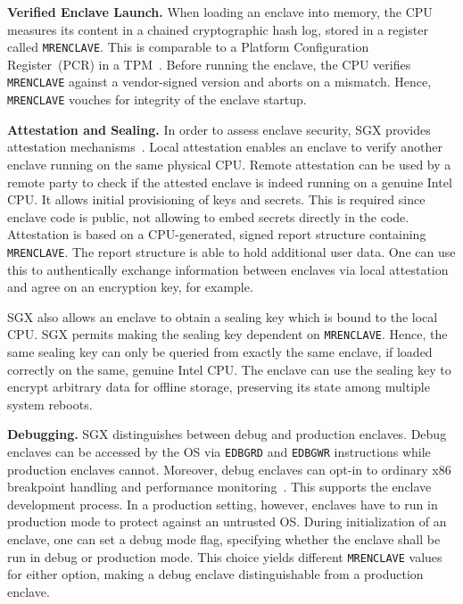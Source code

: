 \documentclass{sig-alternate-05-2015}
\begin{document}
\textbf{Verified Enclave Launch.}\label{sec:enclave_startup}
When loading an enclave into memory, the CPU measures its content in a chained cryptographic hash log, stored in a register called \verb!MRENCLAVE!. This is comparable to a Platform Configuration Register~(PCR) in a TPM~\cite{tpm}. Before running the enclave, the CPU verifies \verb!MRENCLAVE! against a vendor-signed version and aborts on a mismatch. Hence, \verb!MRENCLAVE! vouches for integrity of the enclave startup. 


\textbf{Attestation and Sealing.}
In order to assess enclave security, SGX provides attestation mechanisms~\cite{anati_innovative_2013}. Local attestation enables an enclave to verify another enclave running on the same physical CPU. Remote attestation can be used by a remote party to check if the attested enclave is indeed running on a genuine Intel CPU. It allows initial provisioning of keys and secrets. This is required since enclave code is public, not allowing to embed secrets directly in the code. Attestation is based on a CPU-generated, signed report structure containing \verb!MRENCLAVE!. The report structure is able to hold additional user data. One can use this to authentically exchange information between enclaves via local attestation and agree on an encryption key, for example. 

SGX also allows an enclave to obtain a sealing key which is bound to the local CPU. SGX permits making the sealing key dependent on \verb!MRENCLAVE!. Hence, the same sealing key can only be queried from exactly the same enclave, if loaded correctly on the same, genuine Intel CPU. The enclave can use the sealing key to encrypt arbitrary data for offline storage, preserving its state among multiple system reboots. 

\textbf{Debugging.}
SGX distinguishes between debug and production enclaves. Debug enclaves can be accessed by the OS via \verb!EDBGRD! and \verb!EDBGWR! instructions while production enclaves cannot. Moreover, debug enclaves can opt-in to ordinary x86 breakpoint handling and performance monitoring~\cite{sgxsdm}. This supports the enclave development process. In a production setting, however, enclaves have to run in production mode to protect against an untrusted OS. During initialization of an enclave, one can set a debug mode flag, specifying whether the enclave shall be run in debug or production mode. This choice yields different \verb!MRENCLAVE! values for either option, making a debug enclave distinguishable from a production enclave. 
\end{document}
